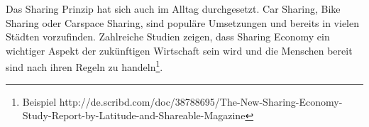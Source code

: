 Das Sharing Prinzip hat sich auch im Alltag durchgesetzt.
Car Sharing, Bike Sharing oder Carspace Sharing, sind populäre Umsetzungen und bereits in vielen Städten vorzufinden. Zahlreiche Studien zeigen, dass Sharing Economy ein wichtiger Aspekt der zukünftigen Wirtschaft sein wird und die Menschen bereit sind nach ihren Regeln zu handeln\footnote{Beispiel http://de.scribd.com/doc/38788695/The-New-Sharing-Economy-Study-Report-by-Latitude-and-Shareable-Magazine}.











